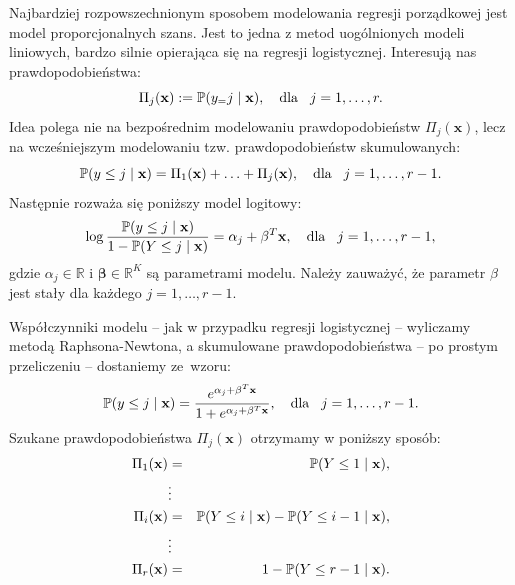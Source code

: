 \documentclass{mini}
\begin{document}
Najbardziej rozpowszechnionym sposobem modelowania regresji porządkowej jest model proporcjonalnych szans. Jest to jedna z metod uogólnionych modeli liniowych, bardzo silnie opierająca się na regresji logistycznej. Interesują nas prawdopodobieństwa: 
$$
\Pi_j(\mathbf{x}):=\mathbb{P}(y_=j\hspace{1mm}|\hspace{1mm}\mathbf{x}),\quad \textrm{dla}\hspace{3mm} j=1,\ldots,r.
$$
Idea polega nie na bezpośrednim modelowaniu prawdopodobieństw $\Pi_j(\mathbf{x})$, lecz na wcześniejszym modelowaniu tzw. prawdopodobieństw skumulowanych:
$$
\mathbb{P}(y\leq j \hspace{1mm}|\hspace{1mm} \mathbf{x})=\Pi_1(\mathbf{x})+\ldots+\Pi_j(\mathbf{x}),\quad \textrm{dla}\hspace{3mm} j=1,\ldots,r-1.
$$
Następnie rozważa się poniższy model logitowy:
$$
\log\dfrac{\mathbb{P}(y\leq j \hspace{1mm}|\hspace{1mm} \mathbf{x})}{1 - \mathbb{P}(Y\leq j \hspace{1mm}|\hspace{1mm} \mathbf{x})} = \alpha_j+\mathbf{\beta}^T\mathbf{x},\quad \textrm{dla}\hspace{3mm} j=1,\ldots,r-1,
$$
gdzie $\alpha_j\in \mathbb{R}$ i $\mathbf{\beta}\in \mathbb{R}^K$ są parametrami modelu. Należy zauważyć, że parametr $\beta$ jest stały dla każdego $j=1, \ldots, r-1$.

Współczynniki modelu -- jak w przypadku regresji logistycznej -- wyliczamy metodą Raphsona-Newtona, a skumulowane prawdopodobieństwa -- po prostym przeliczeniu -- dostaniemy ze~wzoru:
$$
\mathbb{P}(y\leq j \hspace{1mm}|\hspace{1mm} \mathbf{x})=\dfrac{e^{\alpha_j+\mathbf{\beta}^T\mathbf{x}}}{1+e^{\alpha_j+\mathbf{\beta}^T\mathbf{x}}},\quad \textrm{dla}\hspace{3mm} j=1,\ldots,r-1.
$$ 
Szukane prawdopodobieństwa $\Pi_j(\mathbf{x})$ otrzymamy w poniższy sposób:
\begin{eqnarray*}
\Pi_1(\mathbf{x}) &=& \mathbb{P}(Y\leq 1 \hspace{1mm}|\hspace{1mm}\mathbf{x}),\\
&\vdots&\\
\Pi_i(\mathbf{x}) &=& \mathbb{P}(Y\leq i \hspace{1mm}|\hspace{1mm} \mathbf{x}) - \mathbb{P}(Y\leq i-1 \hspace{1mm}|\hspace{1mm} \mathbf{x}),\\
&\vdots&\\
\Pi_r(\mathbf{x}) &=& 1 - \mathbb{P}(Y\leq r-1 \hspace{1mm}|\hspace{1mm} \mathbf{x}).
\end{eqnarray*}
\end{document}
